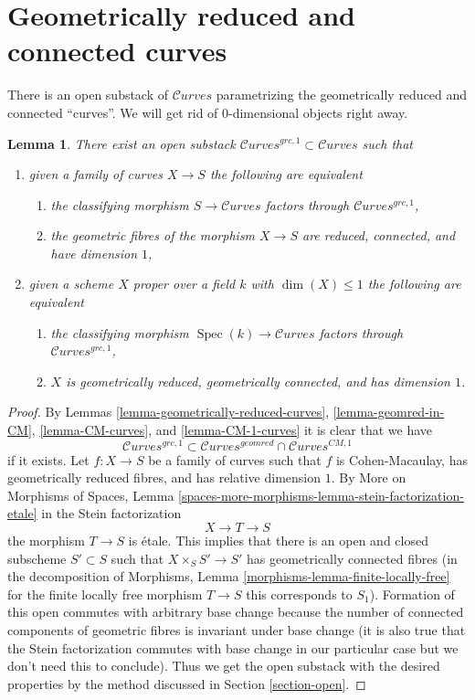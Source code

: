 \documentclass{stacks-project}
\theoremstyle{plain}
\newtheorem{lemma}[subsection]{Lemma}
\theoremstyle{definition}
\theoremstyle{remark}
\numberwithin{equation}{subsection}
\def\Spec{\mathop{\mathrm{Spec}}}
\def\Curvesstack{\mathcal{C}\!\mathit{urves}}
\begin{document}
\section{Geometrically reduced and connected curves}
\label{section-geometrically-reduced-connected}

\noindent
There is an open substack of $\Curvesstack$ parametrizing
the geometrically reduced and connected ``curves''.
We will get rid of $0$-dimensional objects right away.

\begin{lemma}
\label{lemma-geometrically-reduced-connected-1-curves}
There exist an open substack $\Curvesstack^{grc, 1} \subset \Curvesstack$
such that
\begin{enumerate}
\item given a family of curves $X \to S$ the following are equivalent
\begin{enumerate}
\item the classifying morphism $S \to \Curvesstack$ factors
through $\Curvesstack^{grc, 1}$,
\item the geometric fibres of the morphism $X \to S$ are
reduced, connected, and have dimension $1$,
\end{enumerate}
\item given a scheme $X$ proper over a field $k$ with $\dim(X) \leq 1$
the following are equivalent
\begin{enumerate}
\item the classifying morphism $\Spec(k) \to \Curvesstack$ factors
through $\Curvesstack^{grc, 1}$,
\item $X$ is geometrically reduced, geometrically connected,
and has dimension $1$.
\end{enumerate}
\end{enumerate}
\end{lemma}

\begin{proof}
By Lemmas \ref{lemma-geometrically-reduced-curves},
\ref{lemma-geomred-in-CM}, \ref{lemma-CM-curves}, and \ref{lemma-CM-1-curves}
it is clear that we have
$$
\Curvesstack^{grc, 1}
\subset
\Curvesstack^{geomred} \cap \Curvesstack^{CM, 1}
$$
if it exists. Let $f : X \to S$ be a family of curves such that $f$ is
Cohen-Macaulay, has geometrically reduced fibres, and
has relative dimension $1$. By
More on Morphisms of Spaces, Lemma
\ref{spaces-more-morphisms-lemma-stein-factorization-etale}
in the Stein factorization
$$
X \to T \to S
$$
the morphism $T \to S$ is \'etale. This implies that
there is an open and closed subscheme $S' \subset S$
such that $X \times_S S' \to S'$ has geometrically
connected fibres (in the decomposition of
Morphisms, Lemma \ref{morphisms-lemma-finite-locally-free}
for the finite locally free morphism $T \to S$
this corresponds to $S_1$).
Formation of this open commutes with arbitrary base change
because the number of connected components of geometric
fibres is invariant under base change (it is also true
that the Stein factorization commutes with base change
in our particular case but we don't need this to conclude).
Thus we get the open substack with the desired properties
by the method discussed in Section \ref{section-open}.
\end{proof}
\end{document}
